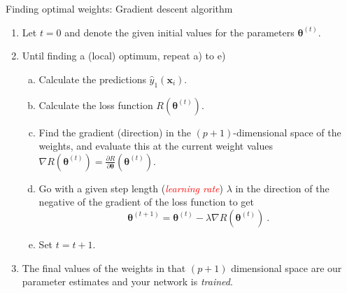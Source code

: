 \documentclass[
  10pt,
  ignorenonframetext,
]{beamer}
\providecommand{\tightlist}{%
  \setlength{\itemsep}{0pt}\setlength{\parskip}{0pt}}
\begin{document}
\begin{frame}
\begin{block}{Finding optimal weights: Gradient descent algorithm}
\protect\hypertarget{finding-optimal-weights-gradient-descent-algorithm}{}
\vspace{2mm}

\begin{enumerate}
\tightlist
\item
  Let \(t=0\) and denote the given initial values for the parameters
  \({\boldsymbol \theta}^{(t)}\). \vspace{2mm}
\item
  Until finding a (local) optimum, repeat a) to e)

  \begin{enumerate}
  [a)]
  \tightlist
  \item
    Calculate the predictions \({\hat{y}_1({\boldsymbol x}_i)}\).
  \item
    Calculate the loss function \(R({\boldsymbol \theta}^{(t)})\).
  \item
    Find the gradient (direction) in the \((p+1)\)-dimensional space of
    the weights, and evaluate this at the current weight values
    \(\nabla R({\boldsymbol \theta}^{(t)})={\frac{\partial R}{\partial {\boldsymbol \theta}}}({\boldsymbol \theta}^{(t)})\).
  \item
    Go with a given step length (\emph{\textcolor{red}{learning rate}})
    \(\lambda\) in the direction of the negative of the gradient of the
    loss function to get
    \[{\boldsymbol \theta}^{(t+1)}={\boldsymbol \theta}^{(t)} - \lambda \nabla R({\boldsymbol \theta}^{(t)}) \ .\]
  \item
    Set \(t=t+1\). \vspace{2mm}
  \end{enumerate}
\item
  The final values of the weights in that \((p+1)\) dimensional space
  are our parameter estimates and your network is \emph{trained}.
\end{enumerate}
\end{block}
\end{frame}
\end{document}
